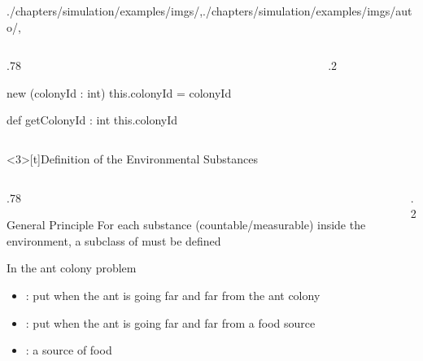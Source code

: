 \begin{graphicspathcontext}{{./chapters/simulation/examples/imgs/},{./chapters/simulation/examples/imgs/auto/},\old}
\begin{frame}
\begin{columns}
\begin{column}[t]{.78\linewidth}
\begin{sarllisting}[basicstyle=\scriptsize]
{  new (colonyId : int) {
   this.colonyId = colonyId
  }

  def getColonyId : int {
   this.colonyId
  }
}
			\end{sarllisting}
		\end{column}
		\begin{column}[t]{.2\linewidth}
		\end{column}
	\end{columns}
\end{frame}

\begin{frame}<3>[t]{Definition of the Environmental Substances}
	\vspace{-.5cm}
	\smaller
	\begin{columns}
		\begin{column}[t]{.78\linewidth}
			\begin{alertblock}{General Principle}
			For each substance (countable/measurable) inside the environment, a subclass of  must be defined
			\end{alertblock}
			\begin{block}{In the ant colony problem}
				\begin{itemize}
				\item {}: put when the ant is going far and far from the ant colony
				\item {}: put when the ant is going far and far from a food source
				\item {}: a source of food
				\end{itemize}
			\end{block}
		\end{column}
		\begin{column}[t]{.2\linewidth}
		\end{column}
	\end{columns}
\end{frame}


\end{graphicspathcontext}
